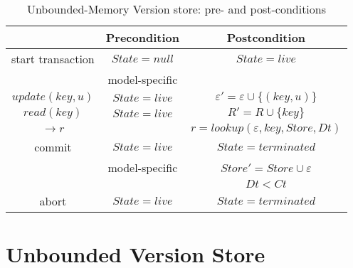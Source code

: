 \documentclass[systeme,french,english]{compas2022}
\newcommand{\commentaire}[2][fromWhom?]{%
  {%
    \color{magenta}{\bfseries\sffamily\scriptsize$\triangleright$(#1:) #2$\triangleleft$}%
  }}
\begin{document}
\begin{table}
  \centering
  \begin{tabular}{c|c|c}
    ~                       & Precondition            & Postcondition \\
    \hline
    
    start transaction       & $\mathit{State = null}$ & $\mathit{State = live}$\\
                            & model-specific          & $                      $\\

    \hline

    $\mathit{update(key,u)}$& $\mathit{State = live}$ & $\mathit{\varepsilon' = \varepsilon \cup \{(key, u)\}}$ \\

    \hline

    $\mathit{read(key)}$    & $\mathit{State = live}$ & $\mathit{R' = R \cup \{key\}}$\\
    $\rightarrow{}r$        &                          & $r = \mathit{lookup(\varepsilon,key,Store,Dt)}$ \\

    \hline

    commit                  & $\mathit{State = live}$ & $\mathit{State = terminated}$\\
                            & model-specific          & $\mathit{Store' = Store \cup \varepsilon}$ \\
                            &                         & $\mathit{Dt < Ct}$ \\
    \hline

    abort                   & $\mathit{State = live}$ & $\mathit{State = terminated}$ \\

  \end{tabular}

  \commentaire[Marc]{@Saalik: Your postcondition for commit does not add the
    transaction tag!!!}
  
  \caption{Unbounded-Memory Version store: pre- and post-conditions}
  \label{tab:AssertInvariantsUnbounded}
\end{table}

\section{Unbounded Version Store}
\end{document}
